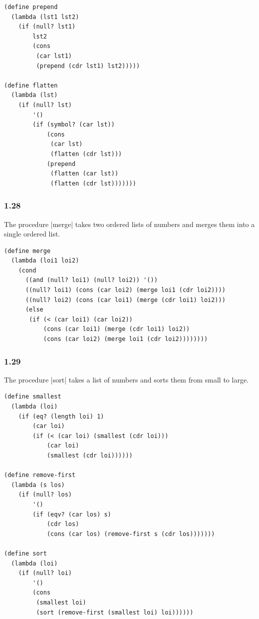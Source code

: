 \documentclass[a4paper]{article}
\begin{document}
\begin{lstlisting}
(define prepend
  (lambda (lst1 lst2)
    (if (null? lst1)
        lst2
        (cons
         (car lst1)
         (prepend (cdr lst1) lst2)))))

(define flatten
  (lambda (lst)
    (if (null? lst)
        '()
        (if (symbol? (car lst))
            (cons
             (car lst)
             (flatten (cdr lst)))
            (prepend
             (flatten (car lst))
             (flatten (cdr lst)))))))
\end{lstlisting}

\subsubsection*{1.28}

The procedure |merge| takes two ordered lists of numbers and merges them into a single ordered list.

\begin{lstlisting}
(define merge
  (lambda (loi1 loi2)
    (cond
      ((and (null? loi1) (null? loi2)) '())
      ((null? loi1) (cons (car loi2) (merge loi1 (cdr loi2))))
      ((null? loi2) (cons (car loi1) (merge (cdr loi1) loi2)))
      (else
       (if (< (car loi1) (car loi2))
           (cons (car loi1) (merge (cdr loi1) loi2))
           (cons (car loi2) (merge loi1 (cdr loi2))))))))
\end{lstlisting}

\subsubsection*{1.29}

The procedure |sort| takes a list of numbers and sorts them from small to large.

\begin{lstlisting}
(define smallest
  (lambda (loi)
    (if (eq? (length loi) 1)
        (car loi)
        (if (< (car loi) (smallest (cdr loi)))
            (car loi)
            (smallest (cdr loi))))))

(define remove-first
  (lambda (s los)
    (if (null? los)
        '()
        (if (eqv? (car los) s)
            (cdr los)
            (cons (car los) (remove-first s (cdr los)))))))

(define sort
  (lambda (loi)
    (if (null? loi)
        '()
        (cons
         (smallest loi)
         (sort (remove-first (smallest loi) loi))))))
\end{lstlisting}
\end{document}
